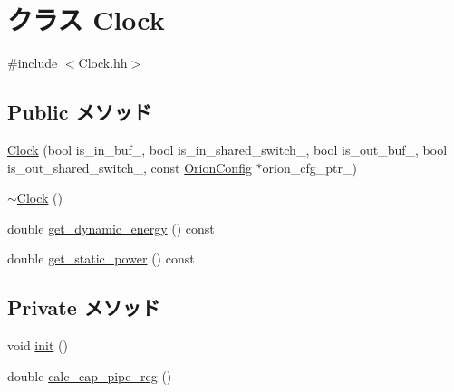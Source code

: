 \hypertarget{classClock}{
\section{クラス Clock}
\label{classClock}
}


{\ttfamily \#include $<$Clock.hh$>$}\subsection*{Public メソッド}
\begin{DoxyCompactItemize}
\item 
\hyperlink{classClock_afe197343ad0f904373af54b8b995fc77}{Clock} (bool is\_\-in\_\-buf\_\-, bool is\_\-in\_\-shared\_\-switch\_\-, bool is\_\-out\_\-buf\_\-, bool is\_\-out\_\-shared\_\-switch\_\-, const \hyperlink{classOrionConfig}{OrionConfig} $\ast$orion\_\-cfg\_\-ptr\_\-)
\item 
\hyperlink{classClock_a4ae998d397f1e7cd192026fe38a071dd}{$\sim$Clock} ()
\item 
double \hyperlink{classClock_aaeb5ba44c1a68a29a876fa2f759c5280}{get\_\-dynamic\_\-energy} () const 
\item 
double \hyperlink{classClock_aeb5933543cfdeb1668baed5ce7c68351}{get\_\-static\_\-power} () const 
\end{DoxyCompactItemize}
\subsection*{Private メソッド}
\begin{DoxyCompactItemize}
\item 
void \hyperlink{classClock_a02fd73d861ef2e4aabb38c0c9ff82947}{init} ()
\item 
double \hyperlink{classClock_a1cea11df279df91aa67a782e8c0ccd1d}{calc\_\-cap\_\-pipe\_\-reg} ()
\end{DoxyCompactItemize}
